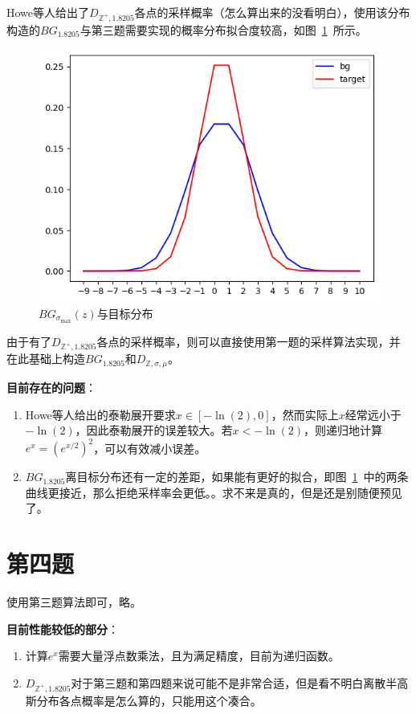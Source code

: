 \documentclass{article}
\begin{document}
    Howe等人\cite{q3}给出了$D_{\mathbb{Z}^+, 1.8205}$各点的采样概率（怎么算出来的没看明白），使用该分布构造的$BG_{1.8205}$与第三题需要实现的概率分布拟合度较高，如图~\ref{fig:q3}~所示。
    \begin{figure}[htb]
        \centering
        \includegraphics[width=.6\textwidth]{q3_0.5.png}
        \caption{$BG_{\sigma_{\mathrm{max}}}(z)$与目标分布}
        \label{fig:q3}
    \end{figure}

    由于有了$D_{\mathbb{Z}^+, 1.8205}$各点的采样概率，则可以直接使用第一题的采样算法实现，并在此基础上构造$BG_{1.8205}$和$D_{\mathbb{Z}, \sigma, \mu}$。

    \textbf{目前存在的问题}：
    \begin{enumerate}
        \item {}
        
        Howe等人给出的泰勒展开要求$x \in [-\ln(2), 0]$，然而实际上$x$经常远小于$-\ln(2)$，因此泰勒展开的误差较大。若$x < -\ln(2)$，则递归地计算$e^x = (e^{x/2})^2$，可以有效减小误差。

        \item $BG_{1.8205}$离目标分布还有一定的差距，如果能有更好的拟合，即图~\ref{fig:q3}~中的两条曲线更接近，那么拒绝采样率会更低。。求不来是真的，但是还是别随便预见了。
    \end{enumerate}

    \section{第四题}
    使用第三题算法即可，略。

    \textbf{目前性能较低的部分}：
    \begin{enumerate}
        \item 计算$e^x$需要大量浮点数乘法，且为满足精度，目前为递归函数。
        \item $D_{\mathbb{Z}^+, 1.8205}$对于第三题和第四题来说可能不是非常合适，但是看不明白离散半高斯分布各点概率是怎么算的，只能用这个凑合。
    \end{enumerate}
\end{document}
